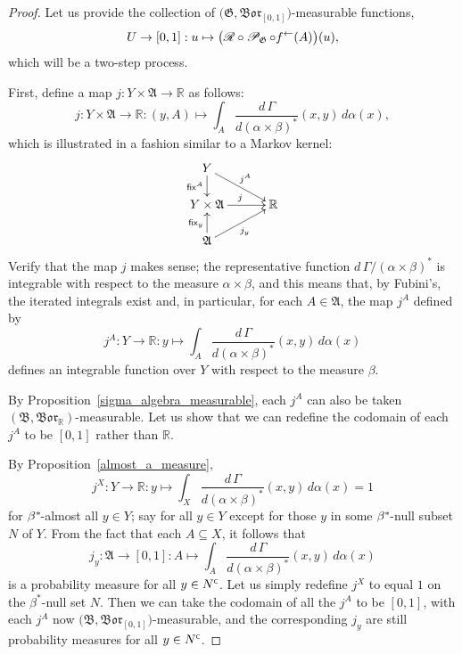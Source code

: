 \documentclass[
twoside=true,
paper=letter,
fontsize=11pt,
pagesize=auto,
leqno,
openany,
headsepline,
overfullrule,
]{scrbook}
\theoremstyle{plain}
\theoremstyle{plain}
\theoremstyle{definition}
\theoremstyle{bfnoteitalic}
\theoremstyle{bfnoteroman}
\newcommand{\sigalg}[1]{\mathfrak{#1}}
\newcommand{\cali}[1]{\mathscr{#1}}
\newcommand{\sfop}[1]{\mathsf{#1}}
\newcommand{\condprobop}[1]{\mathop{\cali{P}\hspace{-1pt}}\nolimits_{#1}}
\newcommand{\borel}{\mathfrak{Bor}}
\newcommand{\comp}{^{\hbox{\tiny{$\mathsf C$}}}}
\newcommand{\preimage}[1]{#1^{\leftarrow}}
\newcommand{\R}{\mathbb{R}}
\newcommand{\sigmaalgebra}{\sigalg{A}}
\newcommand{\sigmaalgebraii}{\sigalg{B}}
\newcommand{\kernast}{\ast\kern-1pt}
\newcommand{\funcj}{j}
\newcommand{\function}{f}
\newcommand{\measurespace}{X}
\newcommand{\measurespaceii}{Y}
\newcommand{\mspaceelt}{x}
\newcommand{\mspaceeltii}{y}
\newcommand{\seti}{A}
\newcommand{\regular}{\cali{R}}
\newcommand{\fixinthefirst}[1]{\sfop{fix}_{#1}}
\newcommand{\fixinthesecond}[1]{\sfop{fix}^{#1}}
\newcommand{\uspace}{U}%
\newcommand{\uspaceelt}{u}
\newcommand{\measonprod}{\Gamma}%
\newcommand{\marginalone}{\alpha}%
\newcommand{\marginaltwo}{\beta}%
\begin{document}
\begin{proof}
Let us provide the collection of
$\bigl(\sigalg{G}, \borel_{[0,1]}\bigr)$\hyp{}measurable functions,
\[
\uspace\to [0,1] : \uspaceelt\mapsto
\bigl( \regular\circ\condprobop{\sigalg{G}}\circ\preimage{\function}
(\seti)\bigr)(\uspaceelt),
\]
which will be a two-step process.

First, define a map
$\funcj:\measurespaceii\times\sigmaalgebra\to \R$ as follows:
\[
\funcj
:\measurespaceii\times\sigmaalgebra\to \R
:(\mspaceeltii,\seti)\mapsto
\int_\seti
\dfrac{d\,\measonprod}{d(\marginalone\times\marginaltwo)^*}
(\mspaceelt,\mspaceeltii)\, d\marginalone(\mspaceelt),
\]
which is illustrated in a fashion similar to a Markov kernel:
\[
\xymatrix@R=16pt@C=30pt{
\measurespaceii
\ar[d]_-{\fixinthesecond{\seti}}
\ar[dr]^{\funcj^\seti} &
\\
\measurespaceii\times\sigmaalgebra \ar[r]^{\funcj} & \R
\\
\sigmaalgebra
\ar[ur]_{\funcj_\mspaceeltii}
\ar[u]^{\fixinthefirst{\mspaceeltii}} &
\\
}
\]
Verify that the map $\funcj$ makes sense; the representative function
$d\,\measonprod/(\marginalone\times\marginaltwo)^*$
is integrable with respect to the measure
$\marginalone\times\marginaltwo$, and this means that, by Fubini's, the iterated integrals exist and, in particular, for each
$\seti\in\sigmaalgebra$,
the map $\funcj^\seti$ defined by
\[
\funcj^\seti:
\measurespaceii\to \R
:\mspaceeltii\mapsto
\int_\seti
\dfrac{d\,\measonprod}{d(\marginalone\times\marginaltwo)^*}
(\mspaceelt,\mspaceeltii)\, d\marginalone(\mspaceelt)
\]
defines an integrable function over
$\measurespaceii$ with respect to the measure $\marginaltwo$.

By Proposition~\ref{sigma_algebra_measurable}, each $\funcj^\seti$ can also be taken
$(\sigmaalgebraii,\borel_\R)$\hyp{}measurable.
Let us show that we can redefine the codomain of each
$\funcj^\seti$ to be $[0,1]$ rather than $\R$.

By Proposition~\ref{almost_a_measure},
\[
\funcj^\measurespace:
\measurespaceii\to\R:\mspaceeltii\mapsto
\int_\measurespace \dfrac{d\,\measonprod}{d(\marginalone\times\marginaltwo)^*}
(\mspaceelt,\mspaceeltii)
\,d\marginalone(\mspaceelt)
=
1
\]
for $\marginaltwo^\kernast$\hyp{}almost all  $\mspaceeltii\in\measurespaceii$; say for all
$\mspaceeltii\in\measurespaceii$ except for  those
$\mspaceeltii$ in some $\marginaltwo^\kernast$\hyp{}null subset $N$ of
$\measurespaceii$.
From the fact that each $\seti\subseteq\measurespace$, it follows that
\[
\funcj_\mspaceeltii :\sigmaalgebra \to [0,1]
: \seti \mapsto
\int_\seti
\dfrac{d\,\measonprod}{d(\marginalone\times\marginaltwo)^*}
(\mspaceelt,\mspaceeltii)\, d\marginalone(\mspaceelt)
\]
is a probability measure for all $\mspaceeltii\in N\comp$.
Let us simply redefine $\funcj^\measurespace$ to equal $1$ on the
$\marginaltwo^*$\hyp{}null
set $N$.  Then we can take the codomain of all the $\funcj^\seti$ to be $[0,1]$,
with each $\funcj^\seti$ now
$\bigl( \sigmaalgebraii, \borel_{[0,1]} \bigr)$\hyp{}measurable,
and the corresponding $\funcj_\mspaceeltii$ are still probability measures for all
$\mspaceeltii\in N\comp$.


\end{proof}
\end{document}
